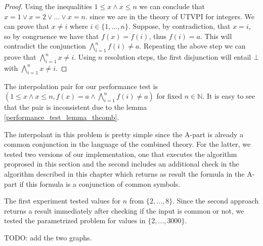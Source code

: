 \begin{proof}
  Using the inequalities $1 \leq x \land x \leq n$
  we can conclude that $x = 1 \lor x = 2 \lor \dots \lor x = n$.
  since we are in the theory of UTVPI for integers.
  We can prove that $x \neq i$ where $i \in \{1, \dots, n \}$.
  Suppose, by contradiction, that $x = i$, so by congruence
  we have that $f(x) = f(i)$, thus $f(i) = a$. This will 
  contradict the conjunction $\bigwedge_{i=1}^{n} f(i) \neq a$.
  Repeating the above step we can prove that 
  $\bigwedge_{i=1}^n x \neq i$. Using $n$ resolution steps, 
  the first disjunction will entail $\bot$ with 
  $\bigwedge_{i=1}^{n} x \neq i$.
\end{proof}

The interpolation pair for our performance test 
is $(1 \leq x \land x \leq n, 
f(x) = a \land \bigwedge_{i=1}^{n} f(i) \neq a)$
for fixed $n \in \mathbb{N}$.
It is easy to see that the pair is inconsistent due to the lemma 
\ref{performance_test_lemma_thcomb}. 

The interpolant in this problem is pretty simple since the 
A-part is already a common conjunction in the language of the
combined theory. For the latter, we tested two versions of our
implementation, one that executes the algorithm proprosed in
this section and the second includes an additional check in 
the algorithm described in this chapter which returns as result
the formula in the A-part if this formula is a conjunction of 
common symbols.

The first experiment tested values for $n$ from $\{2, \dots, 8\}$.
Since the second approach returns a result immediately after
checking if the input is common or not, we tested the parametrized
problem for values in $\{2, \dots, 3000\}$.

TODO: add the two graphs.

